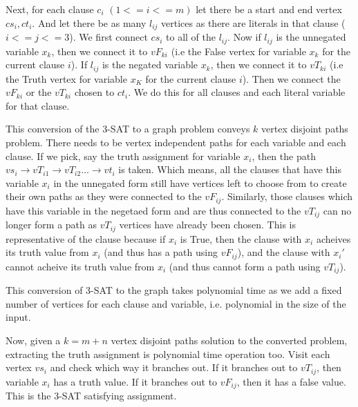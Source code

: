 \documentclass{imports}
\begin{document}
    Next, for each clause $c_i$ $(1<=i<=m)$ let there be a start and end vertex $cs_i, ct_i$. And let there be as many $l_{ij}$ vertices as 
    there are literals in that clause ($i<=j<=3$). We first connect $cs_i$ to all of the $l_{ij}$. Now if $l_{ij}$ is the unnegated variable
    $x_k$, then we connect it to $vF_{ki}$ (i.e the False vertex for variable $x_k$ for the current clause $i$). If $l_{ij}$ is the negated
    variable $x_k$, then we connect it to $vT_{ki}$ (i.e the Truth vertex for variable $x_K$ for the current clause $i$). Then we connect 
    the $vF_{ki}$ or the $vT_{ki}$ chosen to $ct_i$. We do this for all clauses and each literal variable for that clause.
    \vspace{10pt}

    This conversion of the 3-SAT to a graph problem conveys $k$ vertex disjoint paths problem. There needs to be vertex independent
    paths for each variable and each clause. If we pick, say the truth assignment for variable $x_i$, then the path 
    $vs_i \to vT_{i1} \to  vT_{i2} \dots \to vt_i$ is taken. Which means, all the clauses that have this variable $x_i$
    in the unnegated form still have vertices left to choose from to create their own paths as they were connected to the $vF_{ij}$.
    Similarly, those clauses which have this variable in the negetaed form and are thus connected to the $vT_{ij}$ can no longer form a 
    path as $vT_{ij}$ vertices have already been chosen. This is representative of the clause because if $x_i$ is True, then the clause
    with $x_i$ acheives its truth value from $x_i$ (and thus has a path using $vF_{ij}$), and the clause with $x_{i}'$ cannot
    acheive its truth value from $x_i$ (and thus cannot form a path using $vT_{ij}$). \vspace{10pt}

    This conversion of 3-SAT to the graph takes polynomial time as we add a fixed number of vertices for each clause and variable,
    i.e. polynomial in the size of the input. \vspace{10pt}

    Now, given a $k = m+n$ vertex disjoint paths solution to the converted problem, extracting the truth assignment is polynomial time
    operation too. Visit each vertex $vs_i$ and check which way it branches out. If it branches out to $vT_{ij}$, then variable $x_i$ has
    a truth value. If it branches out to $vF_{ij}$, then it has a false value. This is the 3-SAT satisfying assignment.
    \vspace{10pt}
\end{document}
